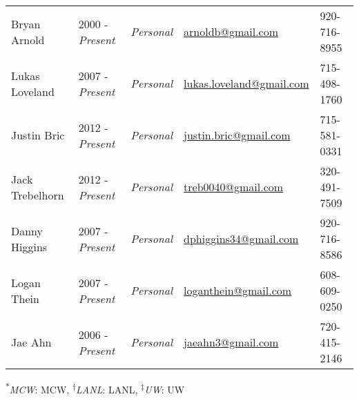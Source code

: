 \begin{center}
\begin{minipage}{\textwidth}
\begin{tabular}{p{3.2cm}p{2.2cm}p{3.3cm}p{5.0cm}p{2.4cm}}

Bryan Arnold & {2000 - \emph{Present}} & \textit{Personal} &  \href{mailto:arnoldb@gmail.com}{arnoldb@gmail.com} &   920-716-8955\\ %

Lukas Loveland & 2007 - \emph{Present} & \textit{Personal} &  \href{mailto:lukas.loveland@gmail.com}{lukas.loveland@gmail.com} &   715-498-1760\\ %

Justin Bric & 2012 - \emph{Present}& \textit{Personal} & \href{mailto:justin.bric@gmail.com}{justin.bric@gmail.com} &  715-581-0331 \\ %
	
Jack Trebelhorn & 2012 - \emph{Present} & \textit{Personal} & \href{mailto:treb0040@gmail.com}{treb0040@gmail.com} &   320-491-7509 \\ %

Danny Higgins & 2007 - \emph{Present} & \textit{Personal} & \href{mailto:dphiggins34@gmail.com}{dphiggins34@gmail.com} & 920-716-8586 \\ %

Logan Thein & 2007 - \emph{Present} & \textit{Personal} & \href{mailto:loganthein@gmail.com}{loganthein@gmail.com}  &   608-609-0250  \\ %

Jae Ahn & 2006 - \emph{Present} & \textit{Personal} & \href{mailto:jaeahn3@gmail.com}{jaeahn3@gmail.com} &   720-415-2146\\ %

\end{tabular}
\end{minipage}
\end{center}

\begin{center}
\begin{minipage}{\textwidth}
\footnotesize
\centering
\textsuperscript{*}\textit{MCW}: MCW, \textsuperscript{$\dagger$}\textit{LANL}: LANL, \textsuperscript{$\ddagger$}\textit{UW}: UW \\
\end{minipage}
\end{center}





%
